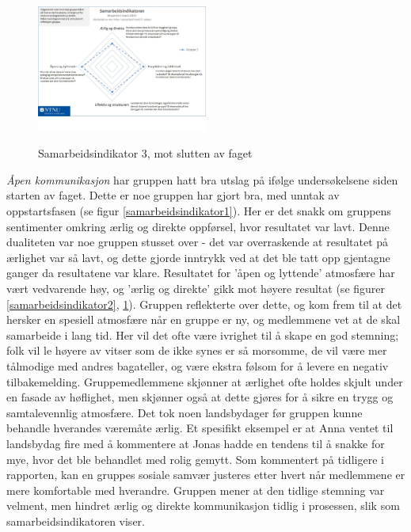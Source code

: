 \begin{figure}[h!]
  \caption{Samarbeidsindikator 3, mot slutten av faget}
  \centering
    \includegraphics[width=0.5\textwidth]{Bilder/samarbeidsindikator_3.jpg}\label{samarbeidsindikator3}
\end{figure}

\emph{Åpen kommunikasjon} har gruppen hatt bra utslag på ifølge undersøkelsene siden starten av faget. 
Dette er noe gruppen har gjort bra, med unntak av oppstartsfasen (se figur \ref{samarbeidsindikator1}).
Her er det snakk om gruppens sentimenter omkring ærlig og direkte oppførsel, hvor resultatet var lavt.
Denne dualiteten var noe gruppen stusset over - det var overraskende at resultatet på ærlighet var så lavt, og dette gjorde inntrykk ved at det ble tatt opp gjentagne ganger da resultatene var klare.
Resultatet for 'åpen og lyttende' atmosfære har vært vedvarende høy, og 'ærlig og direkte' gikk mot høyere resultat (se figurer \ref{samarbeidsindikator2}, \ref{samarbeidsindikator3}).
Gruppen reflekterte over dette, og kom frem til at det hersker en spesiell atmosfære når en gruppe er ny, og medlemmene vet at de skal samarbeide i lang tid.
Her vil det ofte være ivrighet til å skape en god stemning; folk vil le høyere av vitser som de ikke synes er så morsomme, de vil være mer tålmodige med andres bagateller, og være ekstra følsom for å levere en negativ tilbakemelding.
Gruppemedlemmene skjønner at ærlighet ofte holdes skjult under en fasade av høflighet, men skjønner også at dette gjøres for å sikre en trygg og samtalevennlig atmosfære. Det tok noen landsbydager før gruppen kunne behandle hverandes væremåte ærlig.
Et spesifikt eksempel er at Anna ventet til landsbydag fire med å kommentere at Jonas hadde en tendens til å snakke for mye, hvor det ble behandlet med rolig gemytt. 
Som kommentert på tidligere i rapporten, kan en gruppes sosiale samvær justeres etter hvert når medlemmene er mere komfortable med hverandre. 
Gruppen mener at den tidlige stemning var velment, men hindret ærlig og direkte kommunikasjon tidlig i prosessen, slik som samarbeidsindikatoren viser. 
